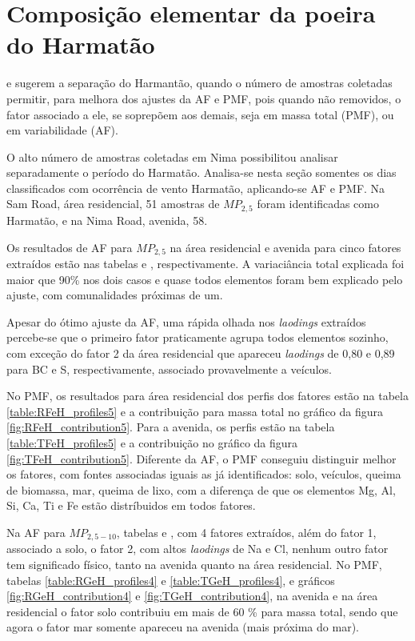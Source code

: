 \newpage
\section{Composição elementar da poeira do Harmatão}


\citet{aboh2009} e \citet{ofosu2013} sugerem a separação do Harmantão, quando 
o número de amostras coletadas permitir, para melhora dos ajustes da AF e PMF, 
pois quando não removidos, o fator associado a ele, se soprepõem 
aos demais, seja em massa total (PMF), ou em variabilidade (AF).

O alto número de amostras coletadas em Nima possibilitou analisar separadamente 
o período do Harmatão. Analisa-se nesta seção somentes os dias classificados 
com ocorrência de vento Harmatão, aplicando-se AF e PMF. 
Na Sam Road, área residencial, 51 amostras de 
$MP_{2,5}$ foram identificadas como Harmatão, e na Nima Road, avenida, 58. 

Os resultados de AF para $MP_{2,5}$ na área residencial e avenida para cinco 
fatores extraídos estão nas tabelas \label{table:AF_RFeH5} e \label{table:AF_TFeH5}, 
respectivamente.  A variaciância total explicada foi maior que 90\% nos dois  
casos e quase todos elementos foram bem explicado pelo ajuste, com comunalidades 
próximas de um. 

Apesar do ótimo ajuste da AF, uma rápida olhada nos \textit{laodings} extraídos
percebe-se que o primeiro fator praticamente agrupa todos elementos sozinho, com 
exceção do fator 2 da área residencial que apareceu \textit{laodings} de 0,80 
e 0,89 para BC e S, respectivamente, associado provavelmente a veículos.

No PMF, os resultados para área residencial dos perfis dos fatores estão na 
tabela \ref{table:RFeH_profiles5} e a contribuição para massa total no gráfico 
da figura \ref{fig:RFeH_contribution5}. Para a avenida, os perfis estão na 
tabela \ref{table:TFeH_profiles5} e a contribuição no gráfico da figura 
\ref{fig:TFeH_contribution5}. Diferente da AF, o PMF conseguiu distinguir melhor
os fatores, com fontes associadas iguais as já identificados: solo, veículos, 
queima de biomassa, mar, queima de lixo, com a diferença de que os elementos 
Mg, Al, Si, Ca, Ti e Fe estão distríbuidos em todos fatores.

Na AF para $MP_{2,5-10}$, tabelas \label{table:AF_RGeH4} e \label{table:AF_TGeH4}, 
com 4 fatores extraídos, além do fator 1, associado a solo, o fator 2, com 
altos \textit{laodings} de Na e Cl, nenhum outro fator tem significado físico, 
tanto na avenida quanto na área residencial. No PMF, tabelas 
\ref{table:RGeH_profiles4} e \ref{table:TGeH_profiles4}, e gráficos 
\ref{fig:RGeH_contribution4} e \ref{fig:TGeH_contribution4}, na avenida e na
área residencial o fator solo contribuiu em mais de 60 \% para massa total, 
sendo que agora o fator mar somente apareceu na avenida (mais próxima do mar).

